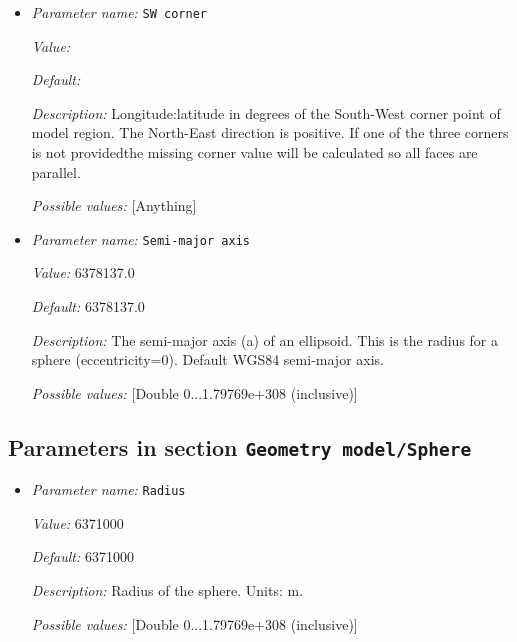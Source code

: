 \begin{itemize}
{\it Value:} 


{\it Default:} 


{\it Description:} Longitude:latitude in degrees of the South-East corner point of model region. The North-East direction is positive. If one of the three corners is not providedthe missing corner value will be calculated so all faces are parallel.


{\it Possible values:} [Anything]
\item {\it Parameter name:} {\tt SW corner}
\label{parameters:Geometry model/Ellipsoidal chunk/SW corner}


{\it Value:} 


{\it Default:} 


{\it Description:} Longitude:latitude in degrees of the South-West corner point of model region. The North-East direction is positive. If one of the three corners is not providedthe missing corner value will be calculated so all faces are parallel.


{\it Possible values:} [Anything]
\item {\it Parameter name:} {\tt Semi-major axis}
\label{parameters:Geometry model/Ellipsoidal chunk/Semi-major axis}


{\it Value:} 6378137.0


{\it Default:} 6378137.0


{\it Description:} The semi-major axis (a) of an ellipsoid. This is the radius for a sphere (eccentricity=0). Default WGS84 semi-major axis.


{\it Possible values:} [Double 0...1.79769e+308 (inclusive)]
\end{itemize}

\subsection{Parameters in section \tt Geometry model/Sphere}
\label{parameters:Geometry_20model/Sphere}

\begin{itemize}
\item {\it Parameter name:} {\tt Radius}
\label{parameters:Geometry model/Sphere/Radius}


{\it Value:} 6371000


{\it Default:} 6371000


{\it Description:} Radius of the sphere. Units: m.


{\it Possible values:} [Double 0...1.79769e+308 (inclusive)]
\end{itemize}

